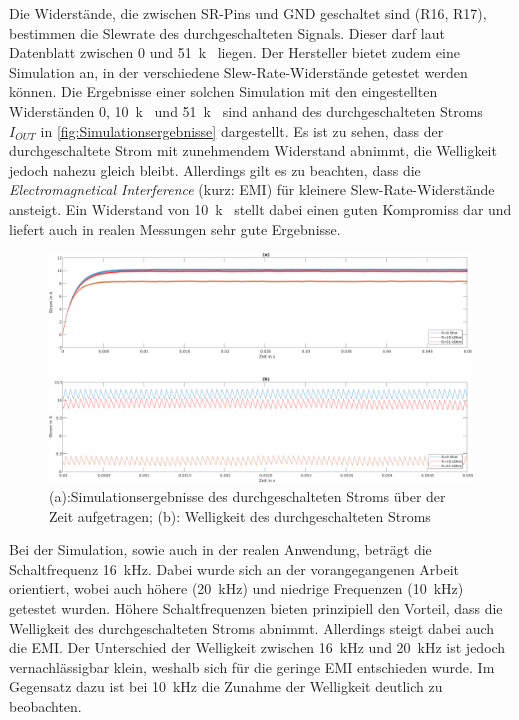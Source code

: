 Die Widerstände, die zwischen SR-Pins und GND geschaltet sind (R16, R17), bestimmen die Slewrate des durchgeschalteten Signals. Dieser darf laut Datenblatt zwischen \SI{0}{\Omega} und \SI{51}{k\Omega} liegen. Der Hersteller bietet zudem eine Simulation an, in der verschiedene Slew-Rate-Widerstände getestet werden können. Die Ergebnisse einer solchen Simulation mit den eingestellten Widerständen \SI{0}{\Omega}, \SI{10}{k\Omega} und \SI{51}{k\Omega} sind anhand des durchgeschalteten Stroms $I_{OUT}$ in \autoref{fig:Simulationsergebnisse} dargestellt. Es ist zu sehen, dass der durchgeschaltete Strom mit zunehmendem Widerstand abnimmt, die Welligkeit jedoch nahezu gleich bleibt. Allerdings gilt es zu beachten, dass die \textit{Electromagnetical Interference} (kurz: EMI) für kleinere Slew-Rate-Widerstände ansteigt. Ein Widerstand von \SI{10}{k\Omega} stellt dabei einen guten Kompromiss dar und liefert auch in realen Messungen sehr gute Ergebnisse.
\begin{figure} [H]
	\centering
	\includegraphics[width=1\linewidth]{Bilder/Simulationsergebnisse.pdf}
	\caption{(a):Simulationsergebnisse des durchgeschalteten Stroms über der Zeit aufgetragen; (b): Welligkeit des durchgeschalteten Stroms}
	\label{fig:Simulationsergebnisse}
\end{figure}\noindent
Bei der Simulation, sowie auch in der realen Anwendung, beträgt die Schaltfrequenz \SI{16}{kHz}. Dabei wurde sich an der vorangegangenen Arbeit orientiert, wobei auch höhere (\SI{20}{kHz}) und niedrige Frequenzen (\SI{10}{kHz}) getestet wurden. Höhere Schaltfrequenzen bieten prinzipiell den Vorteil, dass die Welligkeit des durchgeschalteten Stroms abnimmt. Allerdings steigt dabei auch die EMI. Der Unterschied der Welligkeit zwischen \SI{16}{kHz} und \SI{20}{kHz} ist jedoch vernachlässigbar klein, weshalb sich für die geringe EMI entschieden wurde. Im Gegensatz dazu ist bei \SI{10}{kHz} die Zunahme der Welligkeit deutlich zu beobachten.  

